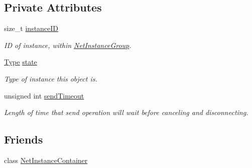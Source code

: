 \subsection*{Private Attributes}
\begin{DoxyCompactItemize}
\item 
\hypertarget{class_net_instance_a46bab6fc672f987ee3c52daabffe34f7}{
size\_\-t \hyperlink{class_net_instance_a46bab6fc672f987ee3c52daabffe34f7}{instanceID}}
\label{class_net_instance_a46bab6fc672f987ee3c52daabffe34f7}

\begin{DoxyCompactList}\small\item\em ID of instance, within \hyperlink{class_net_instance_group}{NetInstanceGroup}. \item\end{DoxyCompactList}\item 
\hypertarget{class_net_instance_a8eda1eb1e030ca5edfc292d97b8efbed}{
\hyperlink{class_net_instance_a0ec01a76d9b78794cfbdeab10a436cdc}{Type} \hyperlink{class_net_instance_a8eda1eb1e030ca5edfc292d97b8efbed}{state}}
\label{class_net_instance_a8eda1eb1e030ca5edfc292d97b8efbed}

\begin{DoxyCompactList}\small\item\em Type of instance this object is. \item\end{DoxyCompactList}\item 
\hypertarget{class_net_instance_a39ed2f4325ce50a7c374ab6253650608}{
unsigned int \hyperlink{class_net_instance_a39ed2f4325ce50a7c374ab6253650608}{sendTimeout}}
\label{class_net_instance_a39ed2f4325ce50a7c374ab6253650608}

\begin{DoxyCompactList}\small\item\em Length of time that send operation will wait before canceling and disconnecting. \item\end{DoxyCompactList}\end{DoxyCompactItemize}
\subsection*{Friends}
\begin{DoxyCompactItemize}
\item 
\hypertarget{class_net_instance_a0ec8400fb82d945920f1752be36f316a}{
class \hyperlink{class_net_instance_a0ec8400fb82d945920f1752be36f316a}{NetInstanceContainer}}
\label{class_net_instance_a0ec8400fb82d945920f1752be36f316a}

\end{DoxyCompactItemize}


